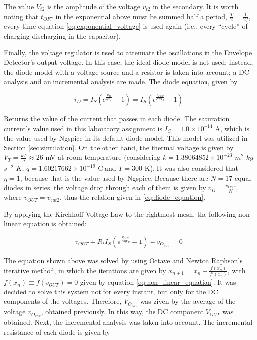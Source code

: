 The value $V_{t2}$ is the amplitude of the voltage $v_{t2}$ in the secondary. It is worth noting that $t_{OFF}$ in the exponential above must be summed half a period, $\frac{T}{2}=\frac{1}{2f}$, every time equation \ref{eq:exponential_voltage} is used again (i.e., every ``cycle'' of charging-discharging in the capacitor).

\par

Finally, the voltage regulator is used to attenuate the oscillations in the Envelope Detector's output voltage. In this case, the ideal diode model is not used; instead, the diode model with a voltage source and a resistor is taken into account; a DC analysis and an incremental analysis are made. The diode equation, given by

\begin{equation} \label{eq:diode_equation}
  i_D=I_S\left(e^{\frac{v_D}{\eta V_T}}-1\right)=I_S\left(e^{\frac{v_{OUT}}{N\eta V_T}}-1\right)
\end{equation}

Returns the value of the current that passes in each diode. The saturation current's value used in this laboratory assignment is $I_S=1.0\times10^{-14}$ A, which is the value used by Ngspice in its default diode model. This model was utilized in Section \ref{sec:simulation}. On the other hand, the thermal voltage is given by $V_T=\frac{kT}{q}\approx 26$ mV at room temperature (considering $k=1.38064852\times10^{-23}$ $m^2$ $kg$ $s^{-2}$ $K$, $q=1.60217662\times10^{-19}$ C and $T=300$ K). It was also considered that $\eta=1$, because that is the value used by Ngspice. Because there are $N=17$ equal diodes in series, the voltage drop through each of them is given by $v_D=\frac{v_{OUT}}{N}$, where $v_{OUT}=v_{out2}$, thus the relation given in \ref{eq:diode_equation}.
\par
By applying the Kirchhoff Voltage Law to the rightmost mesh, the following non-linear equation is obtained:

\begin{equation} \label{eq:non_linear_equation}
  v_{OUT}+R_2I_S\left(e^{\frac{v_{OUT}}{N\eta V_T}}-1\right)-v_{O_{env}}=0
\end{equation}

The equation shown above was solved by using Octave and Newton Raphson's iterative method, in which the iterations are given by $x_{n+1}=x_{n}-\frac{f(x_n)}{f'(x_n)}$, with $f(x_n)\equiv f(v_{OUT})=0$ given by equation \ref{eq:non_linear_equation}. It was decided to solve this system not for every instant, but only for the DC components of the voltages. Therefore, $V_{O_{env}}$ was given by the average of the voltage $v_{O_{env}}$, obtained previously. In this way, the DC component $V_{OUT}$ was obtained. Next, the incremental analysis was taken into account. The incremental resistance of each diode is given by

